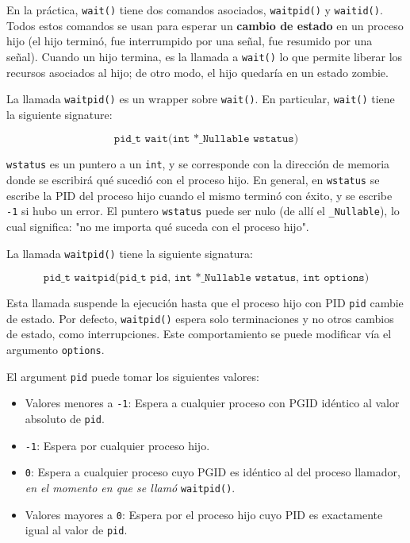 \documentclass[12pt]{article}
\theoremstyle{definition}
\begin{document}
En la práctica, \texttt{wait()} tiene dos comandos asociados, \texttt{waitpid()}
y \texttt{waitid()}.  Todos estos comandos se usan para esperar un
\textbf{cambio de estado} en un proceso hijo (el hijo terminó, fue interrumpido
por una señal, fue resumido por una señal). Cuando un hijo termina, es la
llamada a \texttt{wait()} lo que permite liberar los recursos asociados al hijo;
de otro modo, el hijo quedaría en un estado zombie.

La llamada \texttt{waitpid()} es un wrapper sobre \texttt{wait()}. En
particular, \texttt{wait()} tiene la siguiente signature:

\begin{equation*}
    \texttt{pid\_t wait(int *\_Nullable wstatus)}
\end{equation*}

\texttt{wstatus} es un puntero a un \texttt{int}, y se corresponde con la
dirección de memoria donde se escribirá qué sucedió con el proceso hijo. En
general, en \texttt{wstatus} se escribe la PID del proceso hijo cuando el mismo
terminó con éxito, y se escribe \texttt{-1} si hubo un error. El puntero
\texttt{wstatus} puede ser nulo (de allí el \texttt{\_Nullable}), lo cual
significa: "no me importa qué suceda con el proceso hijo".

La llamada \texttt{waitpid()} tiene la siguiente signatura:

\begin{equation*}
    \texttt{pid\_t waitpid(pid\_t pid, int *\_Nullable wstatus, int options)}
\end{equation*}

Esta llamada suspende la ejecución hasta que el proceso hijo con PID
\texttt{pid} cambie de estado. Por defecto, \texttt{waitpid()} espera solo
terminaciones y no otros cambios de estado, como interrupciones. Este
comportamiento se puede modificar vía el argumento \texttt{options}. 

El argument \texttt{pid} puede tomar los siguientes valores:

\begin{itemize}
    \item Valores menores a \texttt{-1}: Espera a cualquier proceso con PGID
        idéntico al valor absoluto de \texttt{pid}.
    \item \texttt{-1}: Espera por cualquier proceso hijo. 
    \item \texttt{0}: Espera a cualquier proceso cuyo PGID es idéntico al del
        proceso llamador, \textit{en el momento en que se llamó}
        \texttt{waitpid()}.
    \item Valores mayores a \texttt{0}: Espera por el proceso hijo cuyo PID es
        exactamente igual al valor de \texttt{pid}.
\end{itemize}
\end{document}
